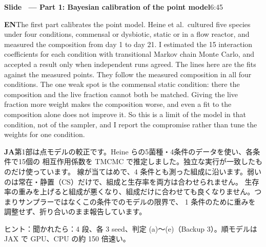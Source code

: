 \documentclass[11pt,a4paper]{article}
\newcounter{sl}
\newcommand{\slide}[2]{\stepcounter{sl}\vspace{8pt}%
  {\color{c3}\large\bfseries Slide \thesl\ --- #1}\hfill{\small #2}\par\vspace{2pt}}
\newcommand{\EN}{\textbf{EN}\quad}
\newcommand{\JA}{\par\textbf{JA}\quad}
\newcommand{\hint}[1]{\par{\color{gray}\small ヒント：#1}}
\begin{document}
\slide{Part 1: Bayesian calibration of the point model}{6:45}
\EN The first part calibrates the point model. Heine et al.\ cultured five
species under four conditions, commensal or dysbiotic, static or in a flow
reactor, and measured the composition from day 1 to day 21. I estimated the
15 interaction coefficients for each condition with transitional Markov chain
Monte Carlo, and accepted a result only when independent runs agreed. The
lines here are the fits against the measured points. They follow the measured composition in all four conditions.
The one weak spot is the commensal static condition: there the composition and the live fraction cannot both be
matched. Giving the live fraction more weight makes the composition worse, and even a fit to the composition alone
does not improve it. So this is a limit of the model in that condition, not of the sampler, and I report the
compromise rather than tune the weights for one condition.
\JA 第1部は点モデルの較正です。Heine らの5菌種・4条件のデータを使い、各条件で15個の
相互作用係数を TMCMC で推定しました。独立な実行が一致したものだけ使っています。
線が当てはめで、4 条件とも測った組成に沿います。弱いのは常在・静置（CS）だけで、組成と生存率を両方は合わせられません。
生存率の重みを上げると組成が悪くなり、組成だけに合わせても良くなりません。つまりサンプラーではなくこの条件でのモデルの限界で、
1 条件のために重みを調整せず、折り合いのまま報告しています。
\hint{聞かれたら：4 段、各 3 seed、判定 (a)〜(e)（Backup 3）。順モデルは JAX で GPU、CPU の約 150 倍速い。}
\end{document}
